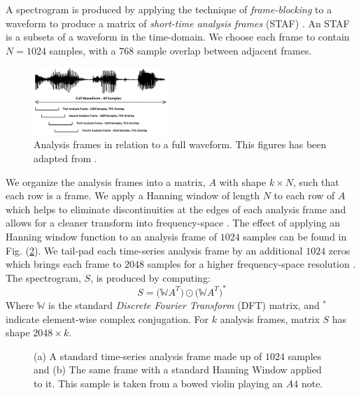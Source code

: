 \documentclass[conference,onecolumn,letterpaper]{IEEEtran}
\begin{document}
A spectrogram is produced by applying the technique of \textit{frame-blocking} to a waveform to produce a matrix of \textit{short-time analysis frames} (STAF) \cite{Liu,Virtanen}. An STAF is a subsets of a waveform in the time-domain. We choose each frame to contain $N = 1024$ samples, with a $768$ sample overlap between adjacent frames. 
\begin{figure}[H]
    \centering
    \includegraphics[width=0.45\textwidth]{figures/AnalysisFrames.png}
    \caption{Analysis frames in relation to a full waveform. This figures has been adapted from \cite{Liu}.}
    \label{fig:AnalysisFrames}
\end{figure}
We organize the analysis frames into a matrix, $A$ with shape $k \times N$, such that each row is a frame. We apply a Hanning window of length $N$ to each row of $A$ which helps to eliminate discontinuities at the edges of each analysis frame and allows for a cleaner transform into frequency-space \cite{Virtanen}. The effect of applying an Hanning window function to an analysis frame of $1024$ samples can be found in Fig. (\ref{fig:WindowFrame}). We tail-pad each time-series analysis frame by an additional $1024$ zeros which brings each frame to $2048$ samples for a higher frequency-space resolution \cite{Sahidullah}. The spectrogram, $S$, is produced by computing:
\begin{equation}
    \label{eqn:Spectrogram}
    S = \big( \mathbb{W}A^T \big) \odot \big( \mathbb{W}A^T \big)^* 
\end{equation}
Where $\mathbb{W}$ is the standard \textit{Discrete Fourier Transform} (DFT) matrix, and $^*$ indicate element-wise complex conjugation. For $k$ analysis frames, matrix $S$ has shape $2048 \times k$. 

\begin{figure}[h]
    \centering
    \caption{(a) A standard time-series analysis frame made up of $1024$ samples and (b) The same frame with a standard Hanning Window applied to it. This sample is taken from a bowed violin playing an $A4$ note.}
    \label{fig:WindowFrame}
\end{figure}
\end{document}
